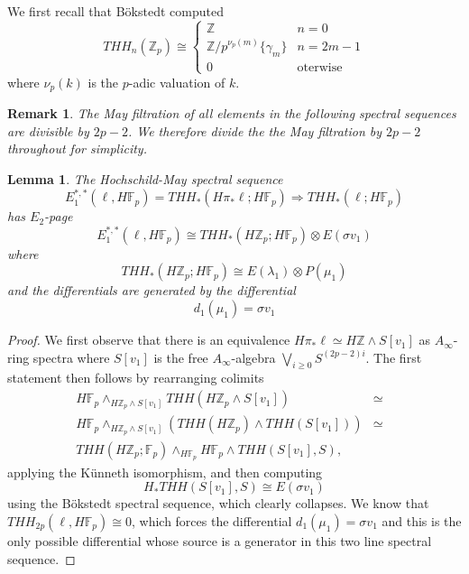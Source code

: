 \documentclass[12pt]{amsart}
\newcommand{\Z}{\mathbb{Z}}
\newcommand{\F}{\mathbb{F}}
\newtheorem{lem}[equation]{Lemma}
\newtheorem{rem}[equation]{Remark}
\theoremstyle{definition}
\numberwithin{equation}{section}
\numberwithin{figure}{section}
\begin{document}
We first recall that B\"okstedt computed 
\[ THH_n(\Z_p)\cong 
	\begin{cases} 
		\Z & n=0 \\ 
		\Z/p^{\nu_p(m)}\{\gamma_{m}\} & n=2m-1\\
		0 & \text{oterwise}
	\end{cases}
\]
where $\nu_p(k)$ is the $p$-adic valuation of $k$.

\begin{rem}
The May filtration of all elements in the following spectral sequences are divisible by $2p-2$. We therefore divide the the May filtration by $2p-2$ throughout for simplicity. 
\end{rem}
\begin{lem}
The Hochschild-May spectral sequence 
\[ E_1^{*,*}(\ell,H\F_p)=THH_*(H\pi_*\ell;H\F_p)\Rightarrow THH_*(\ell;H\F_p)\]
has $E_2$-page 
\[E_1^{*,*}(\ell,H\F_p)\cong THH_*(H\Z_p;H\F_p)\otimes E(\sigma v_1)\]
where 
\[ THH_*(H\Z_p;H\F_p)\cong E(\lambda_1)\otimes P(\mu_1)\]
and 
the differentials are generated by the differential 
\[ d_{1}(\mu_1)=\sigma v_1 \]
\end{lem}
\begin{proof}
We first observe that there is an equivalence $H\pi_*\ell\simeq H\Z\wedge S[v_1]$ as $A_{\infty}$-ring spectra where $S[v_1]$ is the free $A_{\infty}$-algebra $\bigvee_{i\ge 0} S^{(2p-2)i}$. The first statement then follows by rearranging colimits 
\[
	\begin{array}{rcl}
	H\F_p\wedge_{H\Z_p\wedge S[v_1]} THH(H\Z_p\wedge S[v_1])&\simeq &\\
	H\F_p\wedge_{H\Z_p\wedge S[v_1]} \left (THH(H\Z_p)\wedge THH(S[v_1]) \right )&\simeq  \\
	THH(H\Z_p;\F_p)\wedge_{H\F_p} H\F_p\wedge THH(S[v_1],S), & &
 	\end{array}
\]
applying the K\"unneth isomorphism, and then computing 
\[ H_*THH(S[v_1],S)\cong E(\sigma v_1)\]
using the B\"okstedt spectral sequence, which clearly collapses. 
We know that $THH_{2p}(\ell,H\F_p)\cong 0$, which forces the differential $d_{1}(\mu_1)=\sigma v_1$ and this is the only possible differential whose source is a generator in this two line spectral sequence. 
\end{proof}
\end{document}
